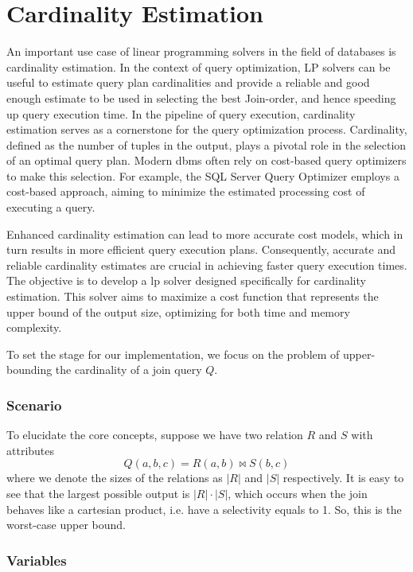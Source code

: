 \section{Cardinality Estimation}\label{section:cardinality-estimate}
An important use case of linear programming solvers in the field of databases is
cardinality estimation.
In the context of query optimization, LP solvers can be useful to estimate query plan
cardinalities and provide a reliable and good enough estimate to be used in selecting
the best Join-order, and hence speeding up query execution time.
In the pipeline of query execution, cardinality estimation serves
as a cornerstone for the query optimization process.
Cardinality, defined as the number of tuples in the output,
plays a pivotal role in the selection of an optimal query plan.
Modern \gls{dbms} often rely on
cost-based query optimizers to make this selection.
For example, the SQL Server Query Optimizer
\parencite{microsoft2023cardinality} employs a
cost-based approach, aiming to minimize the estimated
processing cost of executing a query.

Enhanced cardinality estimation
can lead to more accurate cost models, which in turn results
in more efficient query execution plans.
Consequently, accurate and reliable cardinality estimates are
crucial in achieving faster query execution times.
The objective is to develop a \gls{lp}
solver designed specifically for cardinality estimation.
This solver aims to maximize a cost function that represents
the upper bound of the output size, optimizing for both
time and memory complexity.

To set the stage for our implementation,
we focus on the problem of upper-bounding the
cardinality of a join query $Q$.

\subsubsection{Scenario}
To elucidate the core concepts,
suppose we have two relation $R$ and $S$ with attributes
\[
    Q(a, b, c) = R(a, b) \Join S(b, c)
\]
where we denote the sizes of the relations as
$|R|$ and $|S|$ respectively.
It is easy to see that the largest possible output is $|R| \cdot |S|$, which occurs when the join
behaves like a cartesian product, i.e. have a selectivity equals to 1. So, this is the worst-case
upper bound.
\subsubsection{Variables}
